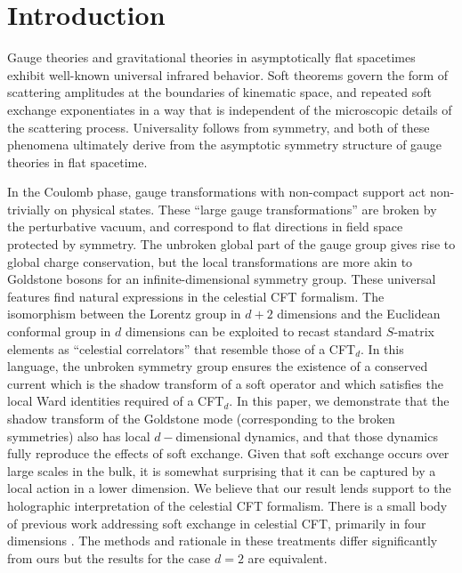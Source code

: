 \documentclass[11pt]{article}
\begin{document}
{\hypersetup{linkcolor=black}
\small
\tableofcontents
}

\section{Introduction}
Gauge theories and gravitational theories in asymptotically flat spacetimes exhibit well-known universal infrared behavior. Soft theorems govern the form of scattering amplitudes at the boundaries of kinematic space, and repeated soft exchange exponentiates in a way that is independent of the microscopic details of the scattering process. Universality follows from symmetry, and both of these phenomena ultimately derive from the asymptotic symmetry structure of gauge theories in flat spacetime. 

In the Coulomb phase, gauge transformations with non-compact support act non-trivially on physical states. These ``large gauge transformations'' are broken by the perturbative vacuum, and correspond to flat directions in field space protected by symmetry. The unbroken global part of the gauge group gives rise to global charge conservation, but the local transformations are more akin to Goldstone bosons for an infinite-dimensional symmetry group. These universal features find natural expressions in the celestial CFT formalism. The isomorphism between the Lorentz group in $d+2$ dimensions and the Euclidean conformal group in $d$ dimensions can be exploited to recast standard $S$-matrix elements as ``celestial correlators'' that resemble those of a CFT$_d$. In this language, the unbroken symmetry group ensures the existence of a conserved current which is the shadow transform of a soft operator \cite{Kapec:2017gsg} and which satisfies the local Ward identities required of a CFT$_d$. In this paper, we demonstrate that the shadow transform of the Goldstone mode (corresponding to the broken symmetries) also has local $d-$dimensional dynamics, and that those dynamics fully reproduce the effects of soft exchange. Given that soft exchange occurs over large scales in the bulk, it is somewhat surprising that it can be captured by a local action in a lower dimension. We believe that our result lends support to the holographic interpretation of the celestial CFT formalism. There is a small body of previous work addressing soft exchange in celestial CFT, primarily in four dimensions \cite{Nande:2017dba,Himwich:2020rro,Arkani-Hamed:2020gyp,Magnea:2021fvy,Gonzalez:2021dxw,Nguyen:2021qkt,Kalyanapuram:2021tnl}. The methods and rationale in these treatments differ significantly from ours but the results for the case $d=2$ are equivalent.
\end{document}
